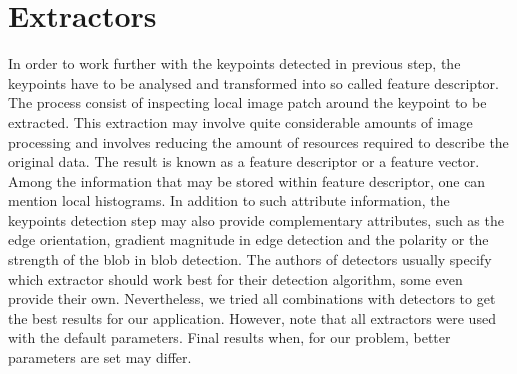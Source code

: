 \section{Extractors}
\label{sec:extractors}
In order to work further with the keypoints detected in previous step, the keypoints have to be analysed and transformed into so called feature descriptor. The process consist of inspecting local image patch around the keypoint to be extracted. This extraction may involve quite considerable amounts of image processing and involves reducing the amount of resources required to describe the original data. The result is known as a feature descriptor or a feature vector. Among the information that may be stored within feature descriptor, one can mention local histograms. In addition to such attribute information, the keypoints detection step may also provide complementary attributes, such as the edge orientation, gradient magnitude in edge detection and the polarity or the strength of the blob in blob detection. The authors of detectors usually specify which extractor should work best for their detection algorithm, some even provide their own. Nevertheless, we tried all combinations with detectors to get the best results for our application. However, note that all extractors were used with the default parameters. Final results when, for our problem, better parameters are set may differ.

